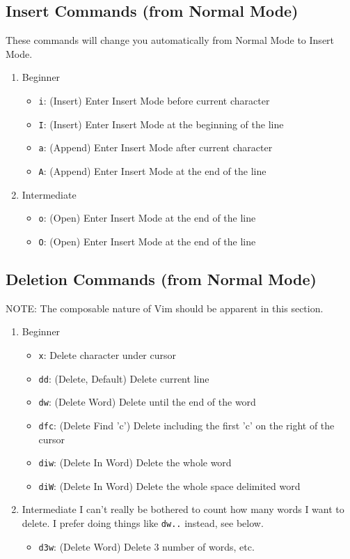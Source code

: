 \documentclass[11pt]{article}
\begin{document}
\subsection{Insert Commands (from Normal Mode)}
\label{sec:org4578dbc}
These commands will change you automatically from Normal Mode
to Insert Mode.
\begin{enumerate}
\item Beginner
\label{sec:orgf4532f0}
\begin{itemize}
\item \texttt{i}: (Insert) Enter Insert Mode before current character
\item \texttt{I}: (Insert) Enter Insert Mode at the beginning of the line
\item \texttt{a}: (Append) Enter Insert Mode after current character
\item \texttt{A}: (Append) Enter Insert Mode at the end of the line
\end{itemize}
\item Intermediate
\label{sec:org1b85eb5}
\begin{itemize}
\item \texttt{o}: (Open) Enter Insert Mode at the end of the line
\item \texttt{O}: (Open) Enter Insert Mode at the end of the line
\end{itemize}
\end{enumerate}
\subsection{Deletion Commands (from Normal Mode)}
\label{sec:org4372fa9}
NOTE: The composable nature of Vim should be apparent in this section.
\begin{enumerate}
\item Beginner
\label{sec:org6f4de6d}
\begin{itemize}
\item \texttt{x}: Delete character under cursor
\item \texttt{dd}: (Delete, Default) Delete current line
\item \texttt{dw}: (Delete Word) Delete until the end of the word
\item \texttt{dfc}: (Delete Find 'c') Delete including the first 'c' on the right of the cursor
\item \texttt{diw}: (Delete In Word) Delete the whole word
\item \texttt{diW}: (Delete In Word) Delete the whole space delimited word
\end{itemize}
\item Intermediate
\label{sec:org298cec1}
I can't really be bothered to count how many words I want to delete.
I prefer doing things like \texttt{dw..} instead, see below.
\begin{itemize}
\item \texttt{d3w}: (Delete Word) Delete 3 number of words, etc.
\end{itemize}
\end{enumerate}
\end{document}
